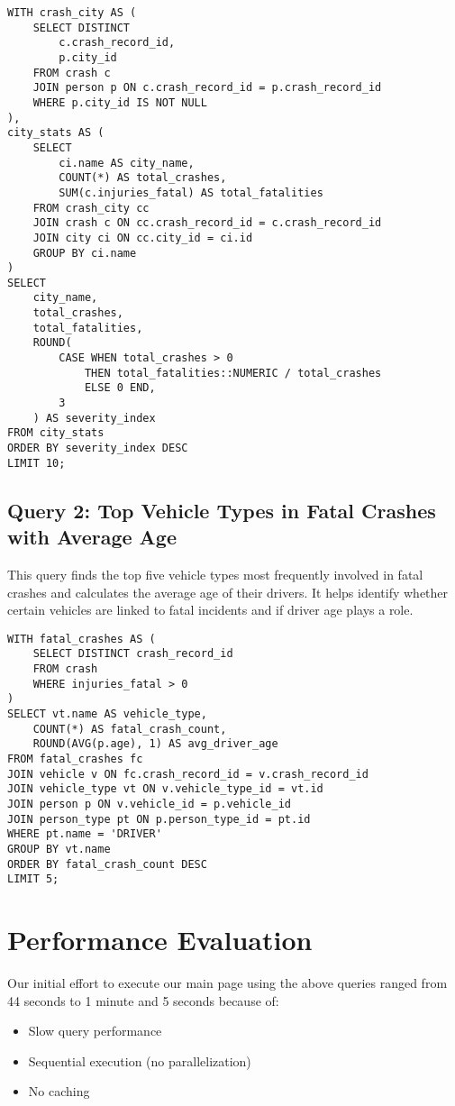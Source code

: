 \documentclass[12pt]{article}
\begin{document}
{\scriptsize
\begin{verbatim}
WITH crash_city AS (
    SELECT DISTINCT
        c.crash_record_id,
        p.city_id
    FROM crash c
    JOIN person p ON c.crash_record_id = p.crash_record_id
    WHERE p.city_id IS NOT NULL
),
city_stats AS (
    SELECT
        ci.name AS city_name,
        COUNT(*) AS total_crashes,
        SUM(c.injuries_fatal) AS total_fatalities
    FROM crash_city cc
    JOIN crash c ON cc.crash_record_id = c.crash_record_id
    JOIN city ci ON cc.city_id = ci.id
    GROUP BY ci.name
)
SELECT
    city_name,
    total_crashes,
    total_fatalities,
    ROUND(
        CASE WHEN total_crashes > 0
            THEN total_fatalities::NUMERIC / total_crashes
            ELSE 0 END,
        3
    ) AS severity_index
FROM city_stats
ORDER BY severity_index DESC
LIMIT 10;
\end{verbatim}}

\subsection{Query 2: Top Vehicle Types in Fatal Crashes with Average Age}

This query finds the top five vehicle types most frequently involved in fatal crashes and calculates the average age of their drivers. It helps identify whether certain vehicles are linked to fatal incidents and if driver age plays a role.

{\scriptsize
\begin{verbatim}
WITH fatal_crashes AS (
    SELECT DISTINCT crash_record_id
    FROM crash
    WHERE injuries_fatal > 0
)
SELECT vt.name AS vehicle_type,
    COUNT(*) AS fatal_crash_count,
    ROUND(AVG(p.age), 1) AS avg_driver_age
FROM fatal_crashes fc
JOIN vehicle v ON fc.crash_record_id = v.crash_record_id
JOIN vehicle_type vt ON v.vehicle_type_id = vt.id
JOIN person p ON v.vehicle_id = p.vehicle_id
JOIN person_type pt ON p.person_type_id = pt.id
WHERE pt.name = 'DRIVER'
GROUP BY vt.name
ORDER BY fatal_crash_count DESC
LIMIT 5;
\end{verbatim}}




\section{Performance Evaluation}

Our initial effort to execute our main page using the above queries ranged from 44 seconds to 1 minute and 5 seconds because of:
\begin{itemize}
  \item Slow query performance
  \item Sequential execution (no parallelization)
  \item No caching
\end{itemize}
\end{document}
